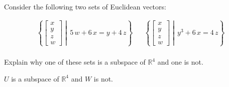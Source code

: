 
\begin{exerciseStatement}


Consider the following two sets of Euclidean vectors: 


\begin{align*}  \left\{ \left[\begin{array}{c}
x \\
y \\
z \\
w
\end{array}\right] \middle|\,5 \, w + 6 \, x = y + 4 \, z\right\}  & &   \left\{ \left[\begin{array}{c}
x \\
y \\
z \\
w
\end{array}\right] \middle|\,y^{3} + 6 \, x = 4 \, z\right\}  \\ \end{align*}
            

 Explain why one of these sets is a subspace of \(\mathbb{R}^ 4 \) and one is not. 


\end{exerciseStatement}
    
\begin{exerciseAnswer} 


\(U\) is a subspace of \(\mathbb{R}^ 4 \) and \(W\) is not.


\end{exerciseAnswer}
    
